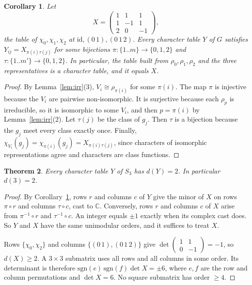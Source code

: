 \documentclass[11pt]{article}
\renewcommand{\_}{\oldus\allowbreak}
\newtheorem{theorem}{Theorem}
\newtheorem{corollary}[theorem]{Corollary}
\theoremstyle{definition}
\theoremstyle{remark}
\begin{document}
\begin{corollary}\label{cor:reindex}
Let
\[
X=\begin{pmatrix}1&1&1\\1&-1&1\\2&0&-1\end{pmatrix},
\]
the table of $\chi_0,\chi_1,\chi_2$ at $\mathrm{id},(0\,1),(0\,1\,2)$. Every character table $Y$ of
$G$ satisfies $Y_{ij}=X_{\pi(i)\tau(j)}$ for some bijections $\pi:\{1..m\}\to\{0,1,2\}$ and
$\tau:\{1..m'\}\to\{0,1,2\}$. In particular, the table built from $\rho_0,\rho_1,\rho_2$ and the
three representatives is a character table, and it equals $X$.
\end{corollary}
\begin{proof}
By Lemma~\ref{lem:irr}(3), $V_i\cong\rho_{\pi(i)}$ for some $\pi(i)$. The map $\pi$ is injective
because the $V_i$ are pairwise non-isomorphic. It is surjective because each $\rho_p$ is irreducible,
so it is isomorphic to some $V_i$, and then $p=\pi(i)$ by Lemma~\ref{lem:irr}(2). Let $\tau(j)$ be
the class of $g_j$. Then $\tau$ is a bijection because the $g_j$ meet every class exactly once.
Finally, $\chi_{V_i}(g_j)=\chi_{\pi(i)}(g_j)=X_{\pi(i)\tau(j)}$, since characters of isomorphic
representations agree and characters are class functions.
\end{proof}

\begin{theorem}\label{thm:d3}
Every character table $Y$ of $S_3$ has $d(Y)=2$. In particular $d(3)=2$.
\end{theorem}
\begin{proof}
By Corollary~\ref{cor:reindex}, rows $r$ and columns $c$ of $Y$ give the minor of $X$ on rows
$\pi\circ r$ and columns $\tau\circ c$, cast to $\mathbb C$. Conversely, rows $r$ and columns $c$
of $X$ arise from $\pi^{-1}\circ r$ and $\tau^{-1}\circ c$. An integer equals $\pm1$ exactly when
its complex cast does. So $Y$ and $X$ have the same unimodular orders, and it suffices to treat $X$.

Rows $\{\chi_0,\chi_2\}$ and columns $\{(0\,1),(0\,1\,2)\}$ give
$\det\begin{pmatrix}1&1\\0&-1\end{pmatrix}=-1$, so $d(X)\ge2$. A $3\times3$ submatrix uses all rows
and all columns in some order. Its determinant is therefore $\mathrm{sgn}(e)\,\mathrm{sgn}(f)\det X=\pm6$,
where $e,f$ are the row and column permutations and $\det X=6$. No square submatrix has order
$\ge4$.
\end{proof}
\end{document}
